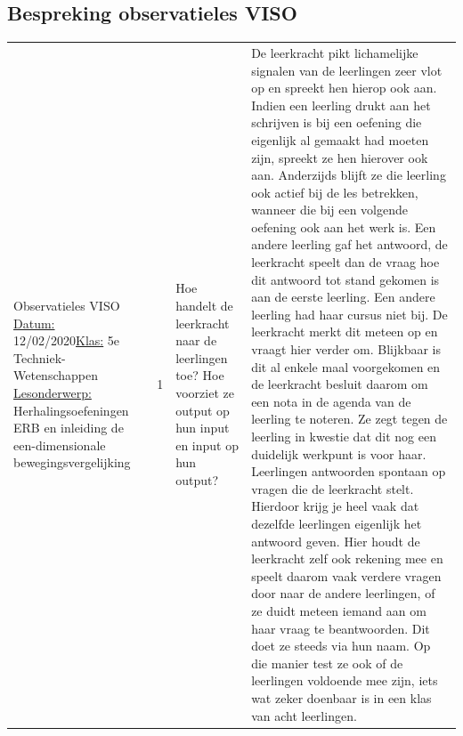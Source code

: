 \documentclass[a4paper,12pt,twoside]{article}%
\begin{document}
\begin{landscape}
	
	\subsection{Bespreking observatieles VISO}
	\begin{tabularx}{1.56\textwidth}{|Q{0.25\textwidth}|Q{0.1\textwidth}|Q{0.25\textwidth}|Q{0.85\textwidth}|}\hline
		Observatieles VISO \newline \underline{Datum:} 12/02/2020\newline \underline{Klas:} 5e Techniek-Wetenschappen \newline \underline{Lesonderwerp:}  Herhalingsoefeningen ERB en inleiding de een-dimensionale bewegingsvergelijking & 1 & Hoe handelt de leerkracht naar de leerlingen toe? Hoe voorziet ze output op hun input en input op hun output? & De leerkracht pikt lichamelijke signalen van de leerlingen zeer vlot op en spreekt hen hierop ook aan. Indien een leerling drukt aan het schrijven is bij een oefening die eigenlijk al gemaakt had moeten zijn, spreekt ze hen hierover ook aan. Anderzijds blijft ze die leerling ook actief bij de les betrekken, wanneer die bij een volgende oefening ook aan het werk is. Een andere leerling gaf het antwoord, de leerkracht speelt dan de vraag hoe dit antwoord tot stand gekomen is aan de eerste leerling. \newline Een andere leerling had haar cursus niet bij. De leerkracht merkt dit meteen op en vraagt hier verder om. Blijkbaar is dit al enkele maal voorgekomen en de leerkracht besluit daarom om een nota in de agenda van de leerling te noteren. Ze zegt tegen de leerling in kwestie dat dit nog een duidelijk werkpunt is voor haar. \newline Leerlingen antwoorden spontaan op vragen die de leerkracht stelt. Hierdoor krijg je heel vaak dat dezelfde leerlingen eigenlijk het antwoord geven. Hier houdt de leerkracht zelf ook rekening mee en speelt daarom vaak verdere vragen door naar de andere leerlingen, of ze duidt meteen iemand aan om haar vraag te beantwoorden. Dit doet ze steeds via hun naam. Op die manier test ze ook of de leerlingen voldoende mee zijn, iets wat zeker doenbaar is in een klas van acht leerlingen.  \\
	\end{tabularx}

\end{landscape}
\end{document}
